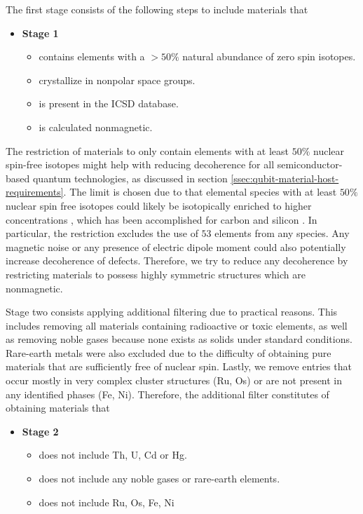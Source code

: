 The first stage consists of the following steps to include materials that
\begin{itemize}
  \item[]{\textbf{Stage 1}}
  \begin{itemize}
  \item contains elements with a $>50\%$ natural abundance of zero spin isotopes.
  \item crystallize in nonpolar space groups.
  \item is present in the ICSD database.
  \item is calculated nonmagnetic.
  \end{itemize}
\end{itemize}

\noindent The restriction of materials to only contain elements with at least $50\%$ nuclear spin-free isotopes might help with reducing decoherence for all semiconductor-based quantum technologies, as discussed in section \autoref{ssec:qubit-material-host-requirements}.
The limit is chosen due to that elemental species with at least $50\%$ nuclear spin free isotopes could likely be isotopically enriched to higher concentrations \cite{Ferrenti2020}, which has been accomplished for carbon \cite{Markham2011, Balasubramanian2009} and silicon \cite{Tyryshkin2011}. In particular, the restriction excludes the use of $53$ elements from any species. Any magnetic noise or any presence of electric dipole moment could also potentially increase decoherence of defects. Therefore, we try to reduce any decoherence by restricting materials to possess highly symmetric structures which are nonmagnetic.

Stage two consists applying additional filtering due to practical reasons. This includes removing all materials containing radioactive or toxic elements, as well as removing noble gases because none exists as solids under standard conditions. Rare-earth metals were also excluded due to the difficulty of obtaining pure materials that are sufficiently free of nuclear spin. Lastly, we remove entries that occur mostly in very complex cluster structures (Ru, Os) or are not present in any identified phases (Fe, Ni). Therefore, the additional filter constitutes of obtaining materials that
\begin{itemize}
  \item[]{\textbf{Stage 2}}
  \begin{itemize}
  \item does not include Th, U, Cd or Hg.
  \item does not include any noble gases or rare-earth elements.
  \item does not include Ru, Os, Fe, Ni
  \end{itemize}
\end{itemize}

